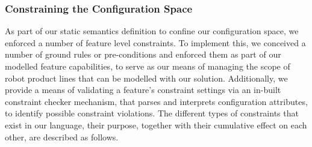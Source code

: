 \documentclass[conference]{IEEEtran}
\begin{document}
\subsubsection{Constraining the Configuration Space}
As part of our static semantics definition to confine our configuration space, we enforced a number of feature level constraints. To implement this, we conceived a number of ground rules or pre-conditions and enforced them as part of our modelled feature capabilities, to serve as our means of managing the scope of robot product lines that can be modelled with our solution. Additionally, we provide a means of validating a feature's constraint settings via an in-built constraint checker mechanism, that parses and interprets configuration attributes, to identify possible constraint violations. The different types of constraints that exist in our language, their purpose, together with their cumulative effect on each other, are described as follows.
\end{document}
